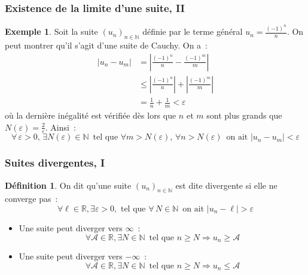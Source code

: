\documentclass[10pt,notheorems]{beamer}
\theoremstyle{plain}
\theoremstyle{definition} %
\newtheorem{definition}{Définition}
\newtheorem{example}{Exemple}
\begin{document}
\begin{frame}
  \frametitle{Existence de la limite d'une suite, II}

  \begin{example}
    Soit la suite $(u_n)_{n\in\mathbb N}$ définie par le terme général $u_n = \frac{(-1)^n}{n}$. On peut montrer qu'il s'agit d'une suite de Cauchy. On a~:
    \[
      \begin{split}
        |u_n-u_m| &= \left|\frac{(-1)^n}{n}-\frac{(-1)^m}{m}\right|\\
        &\leq \left|\frac{(-1)^n}{n}\right|+\left|\frac{(-1)^m}{m}\right|\\
        &= \frac{1}{n} + \frac{1}{m} < \varepsilon
      \end{split}
    \]
    où la dernière inégalité est vérifiée dès lors que $n$ et $m$ sont plus grands que $N(\varepsilon)=\frac{2}{\varepsilon}$. Ainsi~:
    \[
      \forall\,\varepsilon>0,\, \exists N(\varepsilon)\in\mathbb N\,\text{ tel que } \forall m>N(\varepsilon),\, \forall n>N(\varepsilon)\, \text{ on ait }|u_n-u_m|<\varepsilon
    \]
  \end{example}

\end{frame}


\begin{frame}
  \frametitle{Suites divergentes, I}

  \begin{definition}
    On dit qu'une suite $(u_n)_{n\in\mathbb N}$ est dite divergente si elle ne converge pas~:
    \[
      \forall \ell\in\mathbb R, \exists\varepsilon>0, \text{ tel que } \forall\, N\in\mathbb N\, \text{ on ait }  |u_n-\ell|>\varepsilon
    \]
  \end{definition}

  \bigskip

  \begin{itemize}

  \item Une suite peut diverger vers $\infty$~:
    \[
      \forall \mathcal A \in\mathbb R, \exists N\in\mathbb N\, \text{ tel que } n\geq N \Rightarrow u_n\geq \mathcal A
    \]

  \item Une suite peut diverger vers $-\infty$~:
    \[
      \forall \mathcal A \in\mathbb R, \exists N\in\mathbb N\, \text{ tel que } n\geq N \Rightarrow u_n\leq \mathcal A
    \]

  \end{itemize}

\end{frame}
\end{document}

